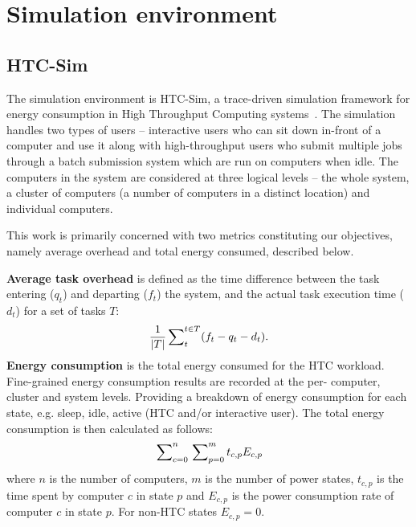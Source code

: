 \documentclass[10pt, conference, compsocconf]{IEEEtran}
\begin{document}
\section{Simulation environment}
\label{environment}

\subsection{HTC-Sim}
The simulation environment is HTC-Sim, a trace-driven simulation framework for energy consumption in High Throughput Computing systems~\cite{htc-sim}. The simulation handles two types of users -- interactive users who can sit down in-front of a computer and use it along with high-throughput users who submit multiple jobs through a batch submission system which are run on computers when idle. The computers in the system are considered at three logical levels -- the whole system, a cluster of computers (a number of computers in a distinct location) and individual computers.

This work is primarily concerned with two metrics constituting our objectives, namely average overhead and total energy consumed, described below.

\textbf{Average task overhead} is defined as the time difference between the task entering ($q_t$) and departing ($f_t$) the system, and the actual task execution time ($d_t$) for a set of tasks $T$:%
\begin{equation*}
\frac{1}{|T|}
\sideset{}{^{t \in T}_{t}}\sum (f_{t} - q_{t} - d_{t}).
	\end{equation*}
\textbf{Energy consumption} is the total energy consumed for the HTC workload. Fine-grained energy consumption results are recorded at the per- computer, cluster and system levels. Providing a breakdown of energy consumption for each state, e.g. sleep, idle, active (HTC and/or interactive user). The total energy consumption is then calculated as follows:
\begin{equation}
\sideset{}{^n_{c=0}}\sum \sideset{}{^m_{p=0}}\sum t_{c,p} E_{c,p}
\end{equation}
\noindent where $n$ is the number of computers, $m$ is the number of power states, $t_{c,p}$ is the time spent by computer $c$ in state $p$ and $E_{c,p}$ is the power consumption rate of computer $c$ in state $p$. For non-HTC states $E_{c,p} = 0$.
\end{document}
